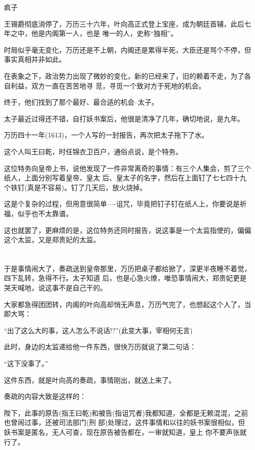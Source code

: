 \documentclass[11pt,a4paper,onecolumn]{article}
\begin{document}
疯子

王锡爵彻底消停了，万历三十六年，叶向高正式登上宝座，成为朝廷首辅，此后七年之中，他是内阁第一人，也是
唯一的人，史称``独相''。

时局似乎毫无变化，万历还是不上朝，内阁还是累得半死，大臣还是骂个不停，但事实真相并非如此。

在表象之下，政治势力出现了微妙的变化，新的已经来了，旧的赖着不走，为了各自利益，双方一直在苦苦地寻
觅，寻觅一个致对方于死地的机会。

终于，他们找到了那个最好、最合适的机会--太子。

太子最近过得还不错，自打妖书案后，他很是清净了几年，确切地说，是九年。

万历四十一年(1613)，一个人写的一封报告，再次把太子拖下了水。

这个人叫王曰乾，时任锦衣卫百户，通俗点说，是个特务。

这位特务向皇帝上书，说他发现了一件非常离奇的事情：有三个人集会，剪了三个纸人，上面分别写着皇帝、皇太
后、皇太子的名字，然后在上面钉了七七四十九个铁钉(真是不容易)。钉了几天后，放火烧掉。

这是个复杂的过程，但用意很简单----诅咒，毕竟把钉子钉在纸人上，你要说是祈福，似乎也不太靠谱。

这也就罢了，更麻烦的是，这位特务还同时报告，说这事是一个太监指使的，偏偏这个太监，又是郑贵妃的太监。

\section[\thesection]{}

于是事情闹大了，奏疏送到皇帝那里，万历把桌子都给掀了，深更半夜睡不着觉，四下乱转，急得不行。太子知道
后，也是心急火燎，唯恐事情闹大，郑贵妃更是哭天喊地，说这事不是自己干的。

大家都急得团团转，内阁的叶向高却悄无声息，万历气完了，也想起这个人了，当即大骂：

``出了这么大的事，这人怎么不说话!?''(此变大事，宰相何无言)

此时，身边的太监递给他一件东西，很快万历就说了第二句话：

``这下没事了。''

这件东西，就是叶向高的奏疏，事情刚出，就送上来了。

奏疏的内容大致是这样的：

陛下，此事的原告(指王曰乾)和被告(指诅咒者)我都知道，全都是无赖混混，之前也曾闹过事，还被司法部门(刑
部)处理过，这件事情和以往的妖书案很相似，但妖书案是匿名，无人可查，现在原告被告都在，一审就知道，皇上
你不要声张就行了。
\end{document}
